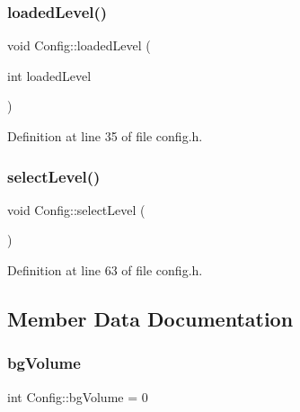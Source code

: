 \hypertarget{class_config_adb67a5a4c628bbf6685ca98008dda8ba}{}\label{class_config_adb67a5a4c628bbf6685ca98008dda8ba} 
\subsubsection{\texorpdfstring{loaded\+Level()}{loadedLevel()}}
{\footnotesize\ttfamily void Config\+::loaded\+Level (\begin{DoxyParamCaption}\item[{int}]{loaded\+Level }\end{DoxyParamCaption})\hspace{0.3cm}{\ttfamily [inline]}}



Definition at line 35 of file config.\+h.

\hypertarget{class_config_a6e411798bbb35067fbd09a73ea6d0eda}{}\label{class_config_a6e411798bbb35067fbd09a73ea6d0eda} 
\subsubsection{\texorpdfstring{select\+Level()}{selectLevel()}}
{\footnotesize\ttfamily void Config\+::select\+Level (\begin{DoxyParamCaption}{ }\end{DoxyParamCaption})\hspace{0.3cm}{\ttfamily [inline]}}



Definition at line 63 of file config.\+h.



\subsection{Member Data Documentation}
\hypertarget{class_config_a816300710638d02dc3c677920d7dd8af}{}\label{class_config_a816300710638d02dc3c677920d7dd8af} 
\subsubsection{\texorpdfstring{bg\+Volume}{bgVolume}}
{\footnotesize\ttfamily int Config\+::bg\+Volume = 0}



